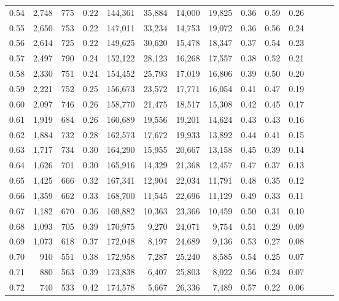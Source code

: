 \begin{tabular}{rrrrrrrrrrrrrr}
0.54 &  2,748 &  775 &  0.22 &  144,361 &   35,884 &  14,000 &  19,825 &  0.36 &  0.59 &      0.26 \\
0.55 &  2,650 &  753 &  0.22 &  147,011 &   33,234 &  14,753 &  19,072 &  0.36 &  0.56 &      0.24 \\
0.56 &  2,614 &  725 &  0.22 &  149,625 &   30,620 &  15,478 &  18,347 &  0.37 &  0.54 &      0.23 \\
0.57 &  2,497 &  790 &  0.24 &  152,122 &   28,123 &  16,268 &  17,557 &  0.38 &  0.52 &      0.21 \\
0.58 &  2,330 &  751 &  0.24 &  154,452 &   25,793 &  17,019 &  16,806 &  0.39 &  0.50 &      0.20 \\
0.59 &  2,221 &  752 &  0.25 &  156,673 &   23,572 &  17,771 &  16,054 &  0.41 &  0.47 &      0.19 \\
0.60 &  2,097 &  746 &  0.26 &  158,770 &   21,475 &  18,517 &  15,308 &  0.42 &  0.45 &      0.17 \\
0.61 &  1,919 &  684 &  0.26 &  160,689 &   19,556 &  19,201 &  14,624 &  0.43 &  0.43 &      0.16 \\
0.62 &  1,884 &  732 &  0.28 &  162,573 &   17,672 &  19,933 &  13,892 &  0.44 &  0.41 &      0.15 \\
0.63 &  1,717 &  734 &  0.30 &  164,290 &   15,955 &  20,667 &  13,158 &  0.45 &  0.39 &      0.14 \\
0.64 &  1,626 &  701 &  0.30 &  165,916 &   14,329 &  21,368 &  12,457 &  0.47 &  0.37 &      0.13 \\
0.65 &  1,425 &  666 &  0.32 &  167,341 &   12,904 &  22,034 &  11,791 &  0.48 &  0.35 &      0.12 \\
0.66 &  1,359 &  662 &  0.33 &  168,700 &   11,545 &  22,696 &  11,129 &  0.49 &  0.33 &      0.11 \\
0.67 &  1,182 &  670 &  0.36 &  169,882 &   10,363 &  23,366 &  10,459 &  0.50 &  0.31 &      0.10 \\
0.68 &  1,093 &  705 &  0.39 &  170,975 &    9,270 &  24,071 &   9,754 &  0.51 &  0.29 &      0.09 \\
0.69 &  1,073 &  618 &  0.37 &  172,048 &    8,197 &  24,689 &   9,136 &  0.53 &  0.27 &      0.08 \\
0.70 &    910 &  551 &  0.38 &  172,958 &    7,287 &  25,240 &   8,585 &  0.54 &  0.25 &      0.07 \\
0.71 &    880 &  563 &  0.39 &  173,838 &    6,407 &  25,803 &   8,022 &  0.56 &  0.24 &      0.07 \\
0.72 &    740 &  533 &  0.42 &  174,578 &    5,667 &  26,336 &   7,489 &  0.57 &  0.22 &      0.06 \\

\end{tabular}
